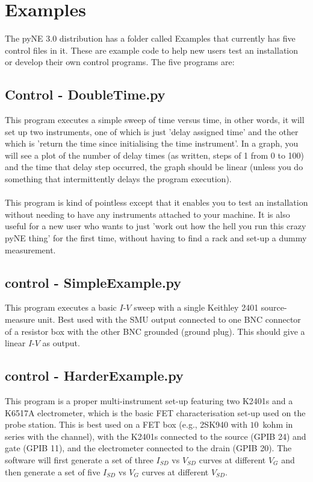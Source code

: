 \chapter{Examples}
The pyNE 3.0 distribution has a folder called Examples that currently has five control files in it. These are example code to help new users test an installation or develop their own control programs. The five programs are:\\
\section{Control - DoubleTime.py}
This program executes a simple sweep of time versus time, in other words, it will set up two instruments, one of which is just 'delay assigned time' and the other which is 'return the time since initialising the time instrument'. In a graph, you will see a plot of the number of delay times (as written, steps of 1 from 0 to 100) and the time that delay step occurred, the graph should be linear (unless you do something that intermittently delays the program execution).\\
\\
This program is kind of pointless except that it enables you to test an installation without needing to have any instruments attached to your machine. It is also useful for a new user who wants to just 'work out how the hell you run this crazy pyNE thing' for the first time, without having to find a rack and set-up a dummy measurement.\\
\section{control - SimpleExample.py}
This program executes a basic $I$-$V$ sweep with a single Keithley 2401 source-measure unit. Best used with the SMU output connected to one BNC connector of a resistor box with the other BNC grounded (ground plug). This should give a linear $I$-$V$ as output.\\
\section{control - HarderExample.py}
This program is a proper multi-instrument set-up featuring two K2401s and a K6517A electrometer, which is the basic FET characterisation set-up used on the probe station. This is best used on a FET box (e.g., 2SK940 with $10$~kohm in series with the channel), with the K2401s connected to the source (GPIB 24) and gate (GPIB 11), and the electrometer connected to the drain (GPIB 20). The software will first generate a set of three $I_{SD}$ vs $V_{SD}$ curves at different $V_{G}$ and then generate a set of five $I_{SD}$ vs $V_{G}$ curves at different $V_{SD}$.\\
